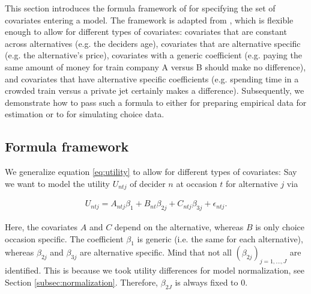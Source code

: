 \documentclass[article]{jss}
\newcommand{\fct}[1]{\code{#1()}}
\begin{document}
This section introduces the formula framework of  for specifying the set of covariates entering a model. The framework is adapted from , which is flexible enough to allow for different types of covariates: covariates that are constant across alternatives (e.g. the deciders age), covariates that are alternative specific (e.g. the alternative's price), covariates with a generic coefficient (e.g. paying the same amount of money for train company A versus B should make no difference), and covariates that have alternative specific coefficients (e.g. spending time in a crowded train versus a private jet certainly makes a difference). Subsequently, we demonstrate how to pass such a formula to either \fct{prepare\_data} for preparing empirical data for estimation or to \fct{simulate\_choices} for simulating choice data.

\subsection{Formula framework} \label{subsec:formula}

We generalize equation \eqref{eq:utility} to allow for different types of covariates: Say we want to model the utility $U_{ntj}$ of decider $n$ at occasion $t$ for alternative $j$ via

\begin{align}
  \label{eq:utility_gen}
  U_{ntj} = A_{ntj} \beta_1 + B_{nt} \beta_{2j} + C_{ntj} \beta_{3j} + \epsilon_{ntj}.
\end{align}

Here, the covariates $A$ and $C$ depend on the alternative, whereas $B$ is only choice occasion specific. The coefficient $\beta_1$ is generic (i.e. the same for each alternative), whereas $\beta_{2j}$ and $\beta_{3j}$ are alternative specific. Mind that not all $(\beta_{2j})_{j=1,\dots,J}$ are identified. This is because we took utility differences for model normalization, see Section \ref{subsec:normalization}. Therefore, $\beta_{2J}$ is always fixed to 0.
\end{document}
